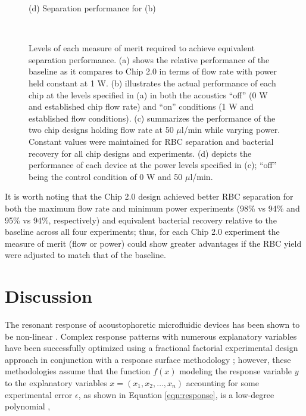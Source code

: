 \begin{figure}[H]
\begin{minipage}[t]{0.49\linewidth}
    \medskip
    \centerline{(d) Separation performance for (b)}
  \end{minipage}\\
  \caption[Bacterial separation performance comparison]{Levels of each measure of merit required to achieve equivalent separation performance. (a) shows the relative performance of the baseline as it compares to Chip 2.0 in terms of flow rate with power held constant at 1 W. (b) illustrates the actual performance of each chip at the levels specified in (a) in both the acoustics ``off'' (0 W and established chip flow rate) and ``on'' conditions (1 W and established flow conditions). (c) summarizes the performance of the two chip designs holding flow rate at 50 $\mu$l/min while varying power. Constant values were maintained for RBC separation and bacterial recovery for all chip designs and experiments. (d) depicts the performance of each device at the power levels specified in (c); ``off'' being the control condition of 0 W and 50 $\mu$l/min.}
	\label{fig:bacPerf}
\end{figure}



It is worth noting that the Chip 2.0 design achieved better RBC separation  for both the maximum flow rate and minimum power experiments (98\% vs 94\% and 95\% vs 94\%, respectively) and equivalent bacterial recovery relative to the baseline across all four experiments; thus, for each Chip 2.0 experiment the measure of merit (flow or power) could show greater advantages if the RBC yield were adjusted to match that of the baseline. 


\section{Discussion}
\label{sec:discussion}

The resonant response of acoustophoretic microfluidic devices has been shown to be non-linear \cite{garofalo2016performance}\cite{bora2015efficient}\cite{glynne2009new}\cite{hahn2014modeling}. Complex response patterns with numerous explanatory variables have been successfully optimized using a fractional factorial experimental design approach in conjunction with a response surface methodology \cite{khuri2010response}; however, these methodologies assume that the function $f(x)$ modeling the response variable $y$ to the explanatory variables $x=(x_1,x_2,\dots,x_n)$ accounting for some experimental error $\epsilon$, as shown in Equation \ref{eqn:response}, is a low-degree polynomial \cite{khuri2010response}, 

